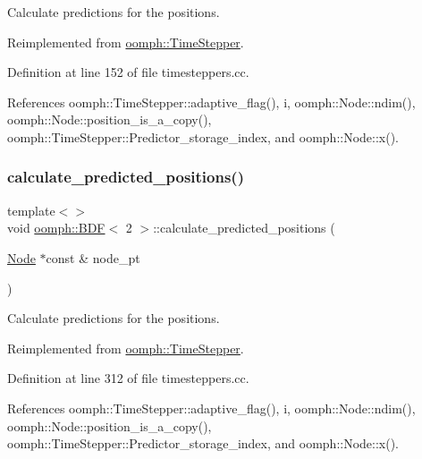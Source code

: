 Calculate predictions for the positions. 



Reimplemented from \hyperlink{classoomph_1_1TimeStepper_a2e7fafceb9330ac971078cf9dc248701}{oomph\+::\+Time\+Stepper}.



Definition at line 152 of file timesteppers.\+cc.



References oomph\+::\+Time\+Stepper\+::adaptive\+\_\+flag(), i, oomph\+::\+Node\+::ndim(), oomph\+::\+Node\+::position\+\_\+is\+\_\+a\+\_\+copy(), oomph\+::\+Time\+Stepper\+::\+Predictor\+\_\+storage\+\_\+index, and oomph\+::\+Node\+::x().

\mbox{\label{classoomph_1_1BDF_a908d5e82020a1083dfb82719efc5c987}} 
\subsubsection{\texorpdfstring{calculate\+\_\+predicted\+\_\+positions()}{calculate\_predicted\_positions()}\hspace{0.1cm}{\footnotesize\ttfamily [2/4]}}
{\footnotesize\ttfamily template$<$$>$ \\
void \hyperlink{classoomph_1_1BDF}{oomph\+::\+B\+DF}$<$ 2 $>$\+::calculate\+\_\+predicted\+\_\+positions (\begin{DoxyParamCaption}\item[{\hyperlink{classoomph_1_1Node}{Node} $\ast$const \&}]{node\+\_\+pt }\end{DoxyParamCaption})\hspace{0.3cm}{\ttfamily [virtual]}}



Calculate predictions for the positions. 



Reimplemented from \hyperlink{classoomph_1_1TimeStepper_a2e7fafceb9330ac971078cf9dc248701}{oomph\+::\+Time\+Stepper}.



Definition at line 312 of file timesteppers.\+cc.



References oomph\+::\+Time\+Stepper\+::adaptive\+\_\+flag(), i, oomph\+::\+Node\+::ndim(), oomph\+::\+Node\+::position\+\_\+is\+\_\+a\+\_\+copy(), oomph\+::\+Time\+Stepper\+::\+Predictor\+\_\+storage\+\_\+index, and oomph\+::\+Node\+::x().

